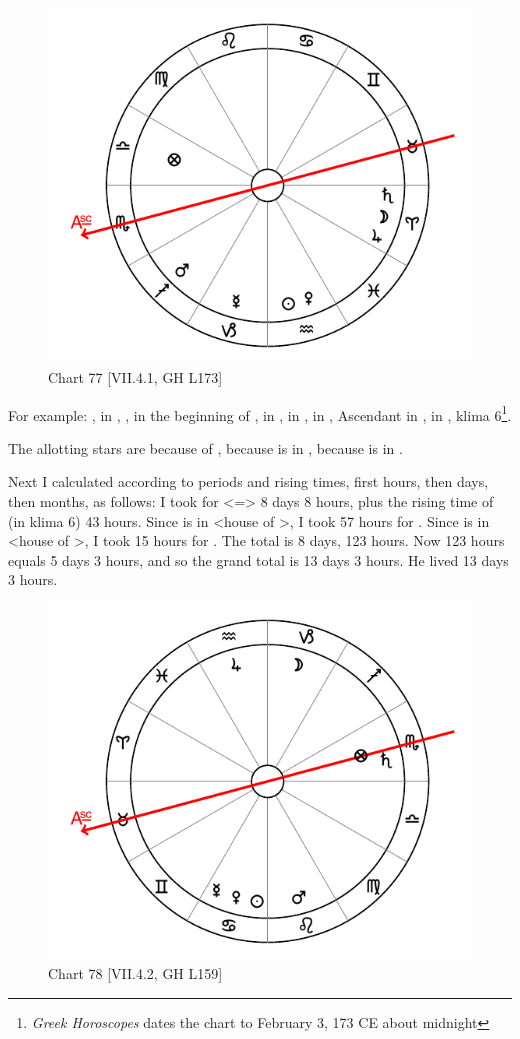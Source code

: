 \begin{figure}
\centering
\vspace{-10pt}
\includegraphics[width=.68\textwidth]{charts/7_4_1}
\caption{Chart 77 [VII.4.1, GH L173]}
\label{fig:chart77}
\end{figure} 

\noindent For example: \Sun, \Venus\xspace in \Aquarius, \Moon, \Jupiter\xspace in the beginning of \Aries, \Saturn\xspace in \Aries, \Mars\xspace in \Sagittarius, \Mercury\xspace in \Capricorn, Ascendant in \Scorpio, \Fortune in \Libra, klima 6\footnote{\textit{Greek Horoscopes} dates the chart to February 3, 173 CE about midnight}. 

\noindent The allotting stars are \Venus\xspace because of \Libra, \Saturn\xspace because \Venus\xspace is in \Aquarius, \Mars\xspace because \Saturn\xspace is in \Aries. 

\noindent Next I calculated according to periods and rising times, first hours, then days, then months, as follows: I took for \Libra\xspace <=\Venus> 8 days 8 hours, plus the rising time of \Libra (in klima 6) 43 hours. Since \Venus\xspace is in \Aquarius\xspace <house of \Saturn>, I took 57 hours for \Saturn. Since \Saturn\xspace is in \Aries\xspace <house of \Mars>, I took 15 hours for \Mars. The total is 8 days, 123 hours. Now 123 hours equals 5 days 3 hours, and so the grand total is 13 days 3 hours. He lived 13 days 3 hours.

\begin{figure}
\centering
\vspace{-10pt}
\includegraphics[width=.68\textwidth]{charts/7_4_2}
\caption{Chart 78 [VII.4.2, GH L159]}
\label{fig:chart78}
\end{figure} 

